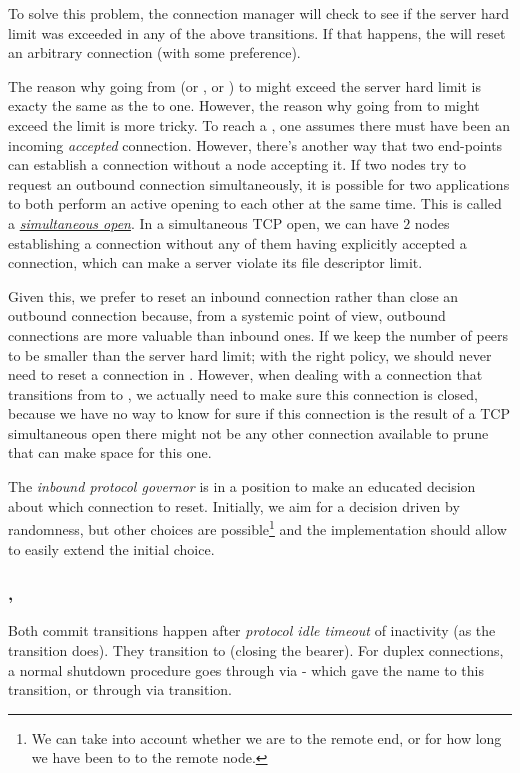 To solve this problem, the connection manager will check
to see if the server hard limit was exceeded in any of the above transitions. If that happens, the \connmngr{} will reset an
arbitrary connection (with some preference).

The reason why going from \OutboundStateDupTau{} (or \OutboundStateDup{}, or
\OutboundIdleStateDup{}) to \InboundStateDup{} might exceed the server hard limit
is exacty the same as the \DuplexState{} to \InboundStateDup{} one.
However, the reason why going from \OutboundStateDupTau{} to \DuplexState{} might
exceed the limit is more tricky.  To reach a \DuplexState{}, one assumes there must
have been an incoming \textit{accepted} connection. However, there's another way that two
end-points can establish a connection without a node accepting it. If two nodes try
to request an outbound connection simultaneously, it is possible for two applications
to both perform an active opening to each other at the same time.  This is called a
\href{https://flylib.com/books/en/3.223.1.190/1/}{\textit{simultaneous open}}.
In a simultaneous TCP open, we can have $2$ nodes establishing a connection without any of
them having explicitly accepted a connection, which can make a server violate its file
descriptor limit.

Given this, we prefer to reset an inbound connection rather than close an outbound
connection because, from a systemic point of view, outbound connections are more
valuable than inbound ones. If we keep the number of \established{} peers to
be smaller than the server hard limit; with the right policy, we should never need
to reset a connection in \DuplexState{}. However, when dealing with a connection that
transitions from \OutboundStateDupTau{} to \DuplexState{}, we actually need to
make sure this connection is closed, because we have no way to know for sure
if this connection is the result of a TCP simultaneous open there might
not be any other connection available to prune that can make space for this one.

The \textit{inbound protocol governor} is in a position to make an educated
decision about which connection to reset. Initially, we aim for a decision driven by
randomness, but other choices are possible\footnote{We can take into account
whether we are \hot{} to the remote end, or for how long we have been \hot{} to
to the remote node.} and the implementation should allow to easily extend the
initial choice.


\subsubsection{\CommitUniRem{}, \CommitDupRem{}}\label{sec:tr_commit_rem}
Both commit transitions happen after \textit{protocol idle timeout} of
inactivity (as the \TimeoutExpired{} transition does). They transition to
\TerminatingState{} (closing the bearer). For duplex connections, a normal
shutdown procedure goes through \InboundIdleStateDup{}
via \CommitDupRem{} - which gave the name to this transition, or through
\OutboundIdleStateDup{} via \CommitDupLoc{} transition.

